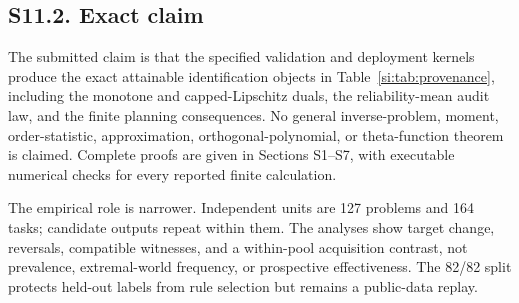 \subsection*{S11.2. Exact claim}

The submitted claim is that the specified validation and deployment kernels
produce the exact attainable identification objects in
Table~\ref{si:tab:provenance}, including the monotone and capped-Lipschitz duals,
the reliability-mean audit law, and the finite planning consequences. No general
inverse-problem, moment, order-statistic, approximation, orthogonal-polynomial,
or theta-function theorem is claimed. Complete proofs are given in Sections
S1--S7, with executable numerical checks for every reported finite calculation.

The empirical role is narrower. Independent units are 127 problems and 164
tasks; candidate outputs repeat within them. The analyses show target change,
reversals, compatible witnesses, and a within-pool acquisition contrast, not
prevalence, extremal-world frequency, or prospective effectiveness. The 82/82
split protects held-out labels from rule selection but remains a public-data
replay.
